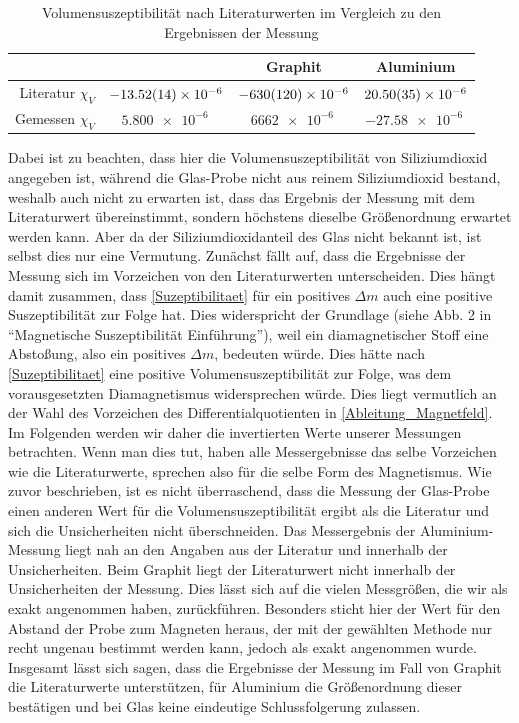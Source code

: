 \documentclass[
	a4paper,
	12pt,
	pagesize,
	ngerman
]{scrartcl}
\begin{document}
	\begin{table}[h]
		\centering
	\begin{tabular}{ r | c | c | c}
		& \ce{SiO2} & Graphit & Aluminium \\ \hline
		Literatur $\chi_V $ & $\SI{-13,52 \pm 0,14 e-6}{}$ & $\SI{-630 \pm 120 e-6}{}$ & $\SI{20,50 \pm 0,35 e-6}{}$\\
		Gemessen  $\chi_V $ & $\SI{5,800 e-6}{}$&$\SI{6662 e-6}{}$&$\SI{-27,58 e-6}{}$\\ \hline %
	\end{tabular} 
	\caption{Volumensuszeptibilität nach Literaturwerten im Vergleich zu den Ergebnissen der Messung}
	\end{table}
	Dabei ist zu beachten, dass hier die Volumensuszeptibilität von Siliziumdioxid angegeben ist, während die Glas-Probe nicht aus reinem Siliziumdioxid bestand, weshalb auch nicht zu erwarten ist, dass das Ergebnis der Messung mit dem Literaturwert übereinstimmt, sondern höchstens dieselbe Größenordnung erwartet werden kann. Aber da der Siliziumdioxidanteil des Glas nicht bekannt ist, ist selbst dies nur eine Vermutung.  \newline
	Zunächst fällt auf, dass die Ergebnisse der Messung sich im Vorzeichen von den Literaturwerten unterscheiden. Dies hängt damit zusammen, dass \cref{Suzeptibilitaet} für ein positives $\Delta m$ auch eine positive Suszeptibilität zur Folge hat. Dies widerspricht der Grundlage (siehe Abb. 2 in \enquote{Magnetische Suszeptibilität Einführung}), weil ein diamagnetischer Stoff eine Abstoßung, also ein positives $\Delta m$, bedeuten würde. Dies hätte nach \cref{Suzeptibilitaet} eine positive Volumensuszeptibilität zur Folge, was dem vorausgesetzten Diamagnetismus widersprechen würde. Dies liegt vermutlich an der Wahl des Vorzeichen des Differentialquotienten in \cref{Ableitung_Magnetfeld}. Im Folgenden werden wir daher die invertierten Werte unserer Messungen betrachten. Wenn man dies tut, haben alle Messergebnisse das selbe Vorzeichen wie die Literaturwerte, sprechen also für die selbe Form des Magnetismus.\newline %
	Wie zuvor beschrieben, ist es nicht überraschend, dass die Messung der Glas-Probe einen anderen Wert für die Volumensuszeptibilität ergibt als die Literatur und sich die Unsicherheiten nicht überschneiden. Das Messergebnis der Aluminium-Messung liegt nah an den Angaben aus der Literatur und innerhalb der Unsicherheiten. Beim Graphit liegt der Literaturwert nicht innerhalb der Unsicherheiten der Messung. Dies lässt sich auf die vielen Messgrößen, die wir als exakt angenommen haben, zurückführen. Besonders sticht hier der Wert für den Abstand der Probe zum Magneten heraus, der mit der gewählten Methode nur recht ungenau bestimmt werden kann, jedoch als exakt angenommen wurde. \newline
	Insgesamt lässt sich sagen, dass die Ergebnisse der Messung im Fall von Graphit die Literaturwerte unterstützen, für Aluminium die Größenordnung dieser bestätigen und bei Glas keine eindeutige Schlussfolgerung zulassen.
	
\end{document}
